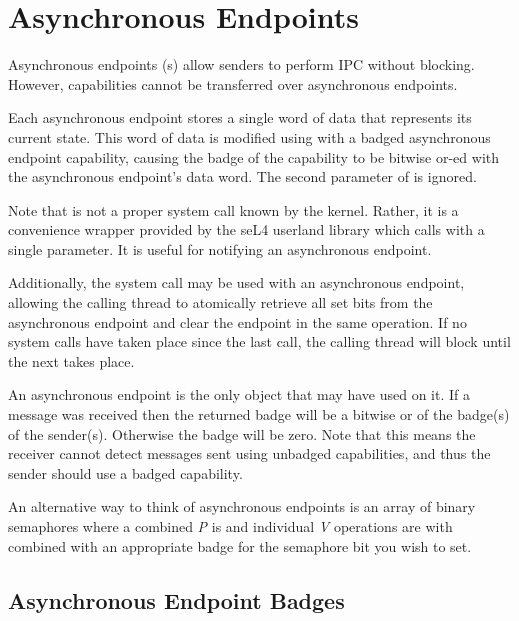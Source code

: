 \section{Asynchronous Endpoints}

Asynchronous endpoints (s)
allow senders to perform IPC without blocking.
However, capabilities cannot be transferred over asynchronous endpoints.

Each asynchronous endpoint stores a single word of data that
represents its current state. This word of data is modified using
 with a badged asynchronous
endpoint capability, causing the badge of the capability to be bitwise
or-ed with the asynchronous endpoint's data word. The second parameter
of  is ignored.

Note that  is not a proper system call
known by the kernel. Rather, it is a convenience
wrapper provided by the seL4 userland library which calls
 with a single parameter. It is
useful for notifying an asynchronous endpoint.

Additionally, the  system call may be used with an
asynchronous endpoint, allowing the calling thread to atomically retrieve all set
bits from the asynchronous endpoint and clear the endpoint in the
same operation. If no  system calls have taken place since the last
 call, the calling thread will block until the next
 takes place.

An asynchronous endpoint is the only object that may have
 used on it. If a message was received then the
returned badge will be a bitwise or of the badge(s) of the sender(s). Otherwise
the badge will be zero. Note that this means the receiver cannot detect
messages sent using unbadged capabilities, and thus the sender should use a
badged capability.

An alternative way to think of asynchronous endpoints is an array of
binary semaphores where a combined \emph{P} is
 and individual \emph{V} operations are
 with combined with an appropriate
badge for the semaphore bit you wish to set. 

\subsection{Asynchronous Endpoint Badges}


